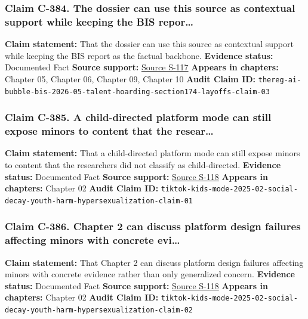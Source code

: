 \documentclass[
  american,
  11pt,
  letterpaper,
]{article}
\begin{document}
\subsubsection{Claim C-384. The dossier can use this source as
contextual support while keeping the BIS
repor\ldots{}}\label{claim-c-384-the-dossier-can-use-this-source-as-contextual-support-while-keeping-the-bis-repor}

\textbf{Claim statement:} That the dossier can use this source as
contextual support while keeping the BIS report as the factual backbone.
\textbf{Evidence status:} Documented Fact \textbf{Source support:}
\hyperref[source-s-117-how-the-ai-bubble-could-pop-and-take-down-the-global-economy-according-to-the-bis]{Source
S-117} \textbf{Appears in chapters:} Chapter 05, Chapter 06, Chapter 09,
Chapter 10 \textbf{Audit Claim ID:}
\texttt{thereg-ai-bubble-bis-2026-05-talent-hoarding-section174-layoffs-claim-03}

\subsubsection{Claim C-385. A child-directed platform mode can still
expose minors to content that the
resear\ldots{}}\label{claim-c-385-a-child-directed-platform-mode-can-still-expose-minors-to-content-that-the-resear}

\textbf{Claim statement:} That a child-directed platform mode can still
expose minors to content that the researchers did not classify as
child-directed. \textbf{Evidence status:} Documented Fact \textbf{Source
support:}
\hyperref[source-s-118-when-kids-mode-isn-t-for-kids-investigating-tiktok-s-under-13-experience]{Source
S-118} \textbf{Appears in chapters:} Chapter 02 \textbf{Audit Claim ID:}
\texttt{tiktok-kids-mode-2025-02-social-decay-youth-harm-hypersexualization-claim-01}

\subsubsection{Claim C-386. Chapter 2 can discuss platform design
failures affecting minors with concrete
evi\ldots{}}\label{claim-c-386-chapter-2-can-discuss-platform-design-failures-affecting-minors-with-concrete-evi}

\textbf{Claim statement:} That Chapter 2 can discuss platform design
failures affecting minors with concrete evidence rather than only
generalized concern. \textbf{Evidence status:} Documented Fact
\textbf{Source support:}
\hyperref[source-s-118-when-kids-mode-isn-t-for-kids-investigating-tiktok-s-under-13-experience]{Source
S-118} \textbf{Appears in chapters:} Chapter 02 \textbf{Audit Claim ID:}
\texttt{tiktok-kids-mode-2025-02-social-decay-youth-harm-hypersexualization-claim-02}
\end{document}
